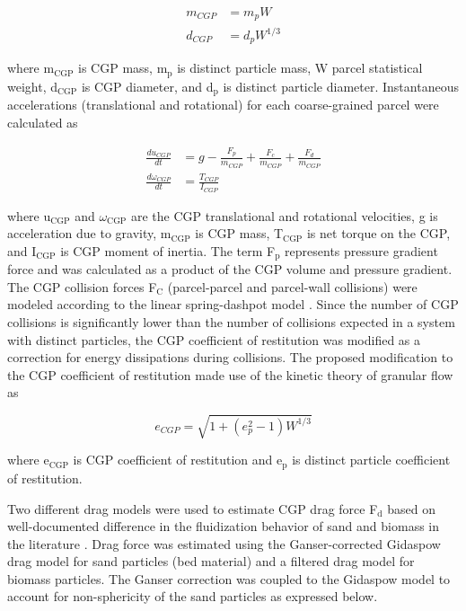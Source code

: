 \begin{align}
    m_{CGP} &= m_p W \\
    d_{CGP} &= d_p W^{1/3}
\end{align}

\noindent where m$_\text{CGP}$ is CGP mass, m$_\text{p}$ is distinct particle mass, W parcel statistical weight, d$_\text{CGP}$ is CGP diameter, and d$_\text{p}$ is distinct particle diameter. Instantaneous accelerations (translational and rotational) for each coarse-grained parcel were calculated as

\begin{align}
    \frac{d u_{CGP}}{dt} &= g - \frac{F_p}{m_{CGP}} + \frac{F_c}{m_{CGP}} + \frac{F_d}{m_{CGP}} \\
    \frac{d \omega_{CGP}}{dt} &= \frac{T_{CGP}}{I_{CGP}}
\end{align}

\noindent where u$_\text{CGP}$ and $\omega_\text{CGP}$ are the CGP translational and rotational velocities, g is acceleration due to gravity, m$_\text{CGP}$ is CGP mass, T$_\text{CGP}$ is net torque on the CGP, and I$_\text{CGP}$ is CGP moment of inertia. The term F$_\text{p}$ represents pressure gradient force and was calculated as a product of the CGP volume and pressure gradient. The CGP collision forces F$_\text{C}$ (parcel-parcel and parcel-wall collisions) were modeled according to the linear spring-dashpot model \cite{Navarro-2013}. Since the number of CGP collisions is significantly lower than the number of collisions expected in a system with distinct particles, the CGP coefficient of restitution was modified as a correction for energy dissipations during collisions. The proposed modification to the CGP coefficient of restitution made use of the kinetic theory of granular flow \cite{Lu-2014} as

\begin{equation}
    e_{CGP} = \sqrt{1 + (e_p^2 - 1) W^{1/3}}
\end{equation}

\noindent where e$_\text{CGP}$ is CGP coefficient of restitution and e$_\text{p}$ is distinct particle coefficient of restitution.

Two different drag models were used to estimate CGP drag force F$_\text{d}$ based on well-documented difference in the fluidization behavior of sand and biomass in the literature \cite{Oliveira-2013}. Drag force was estimated using the Ganser-corrected Gidaspow drag model for sand particles (bed material) and a filtered drag model for biomass particles. The Ganser correction \cite{Ganser-1993} was coupled to the Gidaspow model \cite{Gidaspow-1994} to account for non-sphericity of the sand particles as expressed below.

